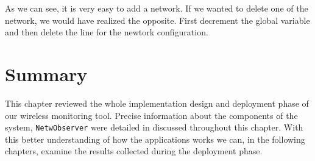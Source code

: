 As we can see, it is very easy to add a network. If we wanted to delete one of the network, we would have realized the opposite. First decrement the global variable and then delete the line for the newtork configuration.



\section{Summary}
This chapter reviewed the whole implementation design and deployment phase of our wireless monitoring tool. Precise information about the components of the system, \texttt{NetwObserver} were detailed in discussed throughout this chapter. With this better understanding of how the applications works we can, in the following chapters, examine the results collected during the deployment phase. 
